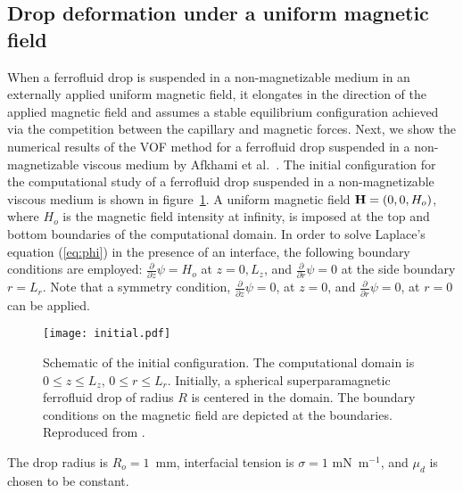 \subsection{Drop deformation under a uniform magnetic field} 
When a ferrofluid drop is suspended in a non-magnetizable medium in an externally applied 
uniform magnetic field, it elongates in the direction of the applied magnetic field and assumes
a stable equilibrium configuration achieved via the competition  between the capillary and magnetic
forces.  Next, we show the numerical results of the VOF method for a ferrofluid drop suspended  in a non-magnetizable viscous medium by Afkhami et al.~\cite{ATRRWPR}. 
The initial configuration for the computational study of a ferrofluid drop  suspended 
in a non-magnetizable viscous medium is shown in figure~\ref{fig:figure4}.
A uniform magnetic field  ${\bf H}=(0,0,H_o)$, where $H_o$     
is the magnetic field intensity at infinity, is imposed at the top and  bottom boundaries
of the computational domain. In order to solve  Laplace's equation (\ref{eq:phi}) in the presence 
of an interface, the 
following boundary conditions are employed:
${\frac{\partial}{\partial z}\psi} = H_o$ at  $z=0, L_z$, and
${\frac{\partial}{\partial r}\psi} = 0$ at the side boundary $r=L_r$.
Note that a symmetry condition, ${\frac{\partial}{\partial z}\psi} = 0$, at $z = 0$,
and ${\frac{\partial}{\partial r}\psi} = 0$, at $r = 0$ can be applied. 
\begin{figure}
\begin{center}
\texttt{[image: initial.pdf]}
\caption{Schematic of the initial configuration. The computational domain is $0\leq z\leq 
L_z$,  $0\leq r \leq L_r$. Initially, a spherical superparamagnetic ferrofluid drop of 
radius $R$ is 
centered in the domain. The boundary conditions on the magnetic field are depicted at the 
boundaries. Reproduced from \cite{ATRRWPR}.} 
\label{fig:figure4}
\end{center}
\end{figure} 
The drop radius is $R_o = 1$~mm,  
interfacial tension is $\sigma = 1$ mN~m$^{-1}$, and 
$\mu_d$ is chosen to be constant. 


